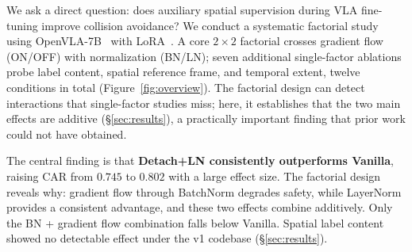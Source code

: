 
We ask a direct question: does auxiliary spatial supervision during VLA fine-tuning improve collision avoidance? We conduct a systematic factorial study using OpenVLA-7B~\cite{kim2024openvla} with LoRA~\cite{hu2022lora}. A core $2{\times}2$ factorial crosses gradient flow (ON/OFF) with normalization (BN/LN); seven additional single-factor ablations probe label content, spatial reference frame, and temporal extent, twelve conditions in total (Figure~\ref{fig:overview}). The factorial design can detect interactions that single-factor studies miss; here, it establishes that the two main effects are additive (\S\ref{sec:results}), a practically important finding that prior work could not have obtained.

The central finding is that \textbf{Detach+LN consistently outperforms Vanilla}, raising CAR from $0.745$ to $0.802$ with a large effect size. The factorial design reveals why: gradient flow through BatchNorm degrades safety, while LayerNorm provides a consistent advantage, and these two effects combine additively. Only the BN + gradient flow combination falls below Vanilla. Spatial label content showed no detectable effect under the v1 codebase (\S\ref{sec:results}).

